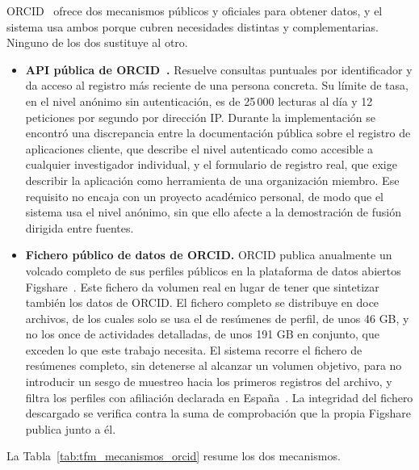 ORCID~\cite{orcid_about} ofrece dos mecanismos públicos y oficiales para
obtener datos, y el sistema usa ambos porque cubren necesidades
distintas y complementarias. Ninguno de los dos sustituye al otro.

\begin{itemize}
  \item \textbf{API pública de ORCID~\cite{orcid_public_api_docs}.}
  Resuelve consultas puntuales por identificador y da acceso al registro
  más reciente de una persona concreta. Su límite de tasa, en el nivel
  anónimo sin autenticación, es de 25\,000 lecturas al día y 12 peticiones
  por segundo por dirección IP. Durante la implementación se encontró una
  discrepancia entre la documentación pública sobre el registro de
  aplicaciones cliente, que describe el nivel autenticado como accesible a
  cualquier investigador individual, y el formulario de registro real, que
  exige describir la aplicación como herramienta de una organización
  miembro. Ese requisito no encaja con un proyecto académico personal, de
  modo que el sistema usa el nivel anónimo, sin que ello afecte a la
  demostración de fusión dirigida entre fuentes.
  \item \textbf{Fichero público de datos de ORCID.} ORCID publica
  anualmente un volcado completo de sus perfiles públicos en la
  plataforma de datos abiertos Figshare~\cite{figshare_docs}. Este
  fichero da volumen real en lugar de tener que sintetizar también los
  datos de ORCID. El fichero completo se distribuye en doce archivos, de
  los cuales solo se usa el de resúmenes de perfil, de unos 46 GB, y no
  los once de actividades detalladas, de unos 191 GB en conjunto, que
  exceden lo que este trabajo necesita. El sistema recorre el fichero de
  resúmenes completo, sin detenerse al alcanzar un volumen objetivo, para
  no introducir un sesgo de muestreo hacia los primeros registros del
  archivo, y filtra los perfiles con afiliación declarada en
  España~\cite{orcid_public_data_file_2025}. La integridad del fichero
  descargado se verifica contra la suma de comprobación que la propia
  Figshare publica junto a él.
\end{itemize}

La Tabla~\ref{tab:tfm_mecanismos_orcid} resume los dos mecanismos.

